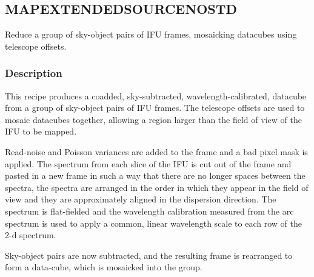 \documentclass[twoside,11pt]{article}
\renewcommand{\_}{\texttt{\symbol{95}}}
\begin{document}
\clearpage

\subsection{MAP\_EXTENDED\_SOURCE\_NOSTD}

Reduce a group of sky-object pairs of IFU frames, mosaicking datacubes
using telescope offsets.

\subsubsection*{Description}

This recipe produces a coadded, sky-subtracted, wavelength-calibrated,
datacube from a group of sky-object pairs of IFU
frames. The telescope offsets are used to mosaic datacubes together,
allowing a region larger than the field of view of the IFU to be
mapped.



Read-noise and Poisson variances are added to the frame and a bad
pixel mask is applied. The spectrum from each slice of the IFU is cut
out of the frame and pasted in a new frame in such a way that there
are no longer spaces between the spectra, the spectra are arranged in
the order in which they appear in the field of view and they are
approximately aligned in the dispersion direction. The spectrum is
flat-fielded and the wavelength calibration measured from the arc
spectrum is used to apply a common, linear wavelength scale to each
row of the 2-d spectrum.



Sky-object pairs are now subtracted, and the resulting frame is
rearranged to form a data-cube, which is mosaicked into the group.
\end{document}
